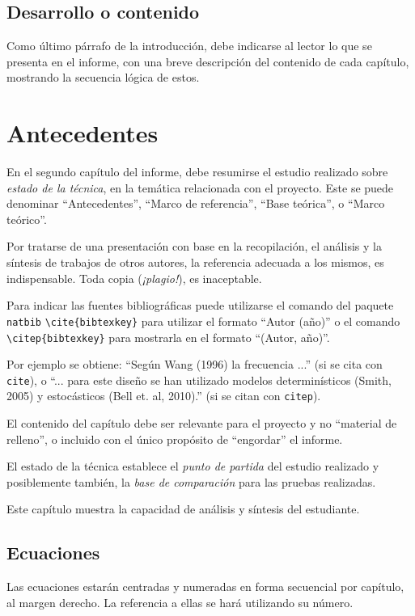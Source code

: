 \section{Desarrollo o contenido}
Como último párrafo de la introducción, debe indicarse al lector lo que se presenta en el informe, con una breve descripción del contenido de cada capítulo, mostrando la secuencia lógica de estos.

\chapter{Antecedentes} \label{sec:L02}
En el segundo capítulo del informe, debe resumirse el estudio realizado sobre \emph{estado de la técnica}, en la temática relacionada con el proyecto.  Este se puede denominar ``Antecedentes'', ``Marco de referencia'', ``Base teórica'', o ``Marco teórico''.

Por tratarse de una presentación con base en la recopilación, el análisis y la síntesis de trabajos de otros autores, la referencia adecuada a los mismos, es indispensable.  Toda copia (\emph{¡plagio!}), es inaceptable.

Para indicar las fuentes bibliográficas puede utilizarse el comando del paquete \texttt{natbib} \texttt{\textbackslash cite\{bibtexkey\}} para utilizar el formato ``Autor (año)'' o el comando \texttt{\textbackslash citep\{bibtexkey\}} para mostrarla en el formato ``(Autor, año)''.

Por ejemplo se obtiene: ``Según Wang (1996) la frecuencia ...'' (si se cita con \texttt{cite}), o ``... para este diseño se han utilizado modelos determinísticos (Smith, 2005) y estocásticos (Bell et. al, 2010).''  (si se citan con \texttt{citep}).  

El contenido del capítulo debe ser relevante para el proyecto y no ``material de relleno'', o incluido con el único propósito de ``engordar'' el informe.

El estado de la técnica establece el \emph{punto de partida} del estudio realizado y posiblemente también, la \emph{base de comparación} para las pruebas realizadas.

Este capítulo muestra la capacidad de análisis y síntesis del estudiante.
 
\section{Ecuaciones}
Las ecuaciones estarán centradas y numeradas en forma secuencial por capítulo, al margen derecho.  La referencia a ellas se hará utilizando su número.

